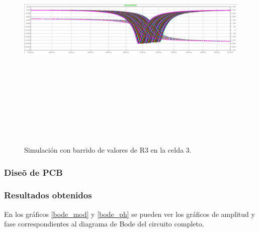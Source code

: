  \begin{figure}[H] %
	\centering	\includegraphics[width=12cm,height=12cm,keepaspectratio]{../EJ4/graficos/etapa3_R3.png}
	\caption{Simulaci\'on con barrido de valores de R3 en la celda 3.}
	\label{celda3_r3}
\end{figure}


\subsubsection{Dise\~o de PCB}

\subsubsection{Resultados obtenidos}

 En los gr\'aficos \ref{bode_mod} y  \ref{bode_ph} se pueden ver los gr\'aficos de amplitud y fase correspondientes al diagrama de Bode del circuito completo.

